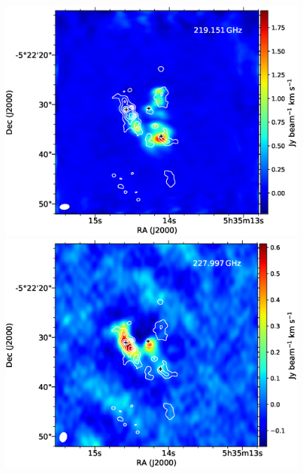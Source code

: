 \begin{figure}[H]
\begin{center}
\begin{minipage}{0.98\textwidth} 
\begin{center}
\begin{minipage}{0.48\textwidth}
\begin{center}
\includegraphics[width=0.98\textwidth]{OrionKL/mom0/219.151mom0_3-7.eps}
\end{center}
\end{minipage}
\begin{minipage}{0.48\textwidth}
\begin{center}
\includegraphics[width=0.98\textwidth]{OrionKL/mom0/227.997SV_mom0_3-7.eps}
\end{center}
\end{minipage}
\end{center}
\end{minipage}


\end{center}
\end{figure}
